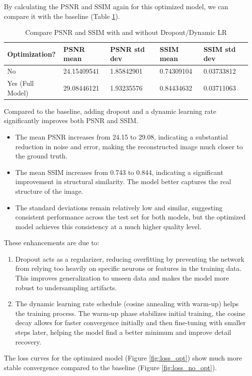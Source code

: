 \documentclass{article}
\begin{document}
By calculating the PSNR and SSIM again for this optimized model, we can compare it with the baseline (Table \ref{tab:opt_compare}).
\begin{table}[H]
  \caption{Compare PSNR and SSIM with and without Dropout/Dynamic LR}
  \label{tab:opt_compare}
  \centering
  \begin{tabular}{lllll}
    \toprule
    Optimization?    & PSNR mean   & PSNR std dev & SSIM mean  & SSIM std dev \\
    \midrule
    No               & 24.15409541 & 1.85842901   & 0.74309104 & 0.03733812   \\
    Yes (Full Model) & 29.08446121 & 1.93235576   & 0.84434632 & 0.03711063   \\
    \bottomrule
  \end{tabular}
\end{table}

Compared to the baseline, adding dropout and a dynamic learning rate significantly improves both PSNR and SSIM.
\begin{itemize}
  \item The mean PSNR increases from 24.15 to 29.08, indicating a substantial reduction in noise and error, making the reconstructed image much closer to the ground truth.
  \item The mean SSIM increases from 0.743 to 0.844, indicating a significant improvement in structural similarity. The model better captures the real structure of the image.
  \item The standard deviations remain relatively low and similar, suggesting consistent performance across the test set for both models, but the optimized model achieves this consistency at a much higher quality level.
\end{itemize}
These enhancements are due to:
\begin{enumerate}
  \item Dropout acts as a regularizer, reducing overfitting by preventing the network from relying too heavily on specific neurons or features in the training data. This improves generalization to unseen data and makes the model more robust to undersampling artifacts.
  \item The dynamic learning rate schedule (cosine annealing with warm-up) helps the training process. The warm-up phase stabilizes initial training, the cosine decay allows for faster convergence initially and then fine-tuning with smaller steps later, helping the model find a better minimum and improve detail recovery.
\end{enumerate}
The loss curves for the optimized model (Figure \ref{fig:loss_opt}) show much more stable convergence compared to the baseline (Figure \ref{fig:loss_no_opt}).
\end{document}
